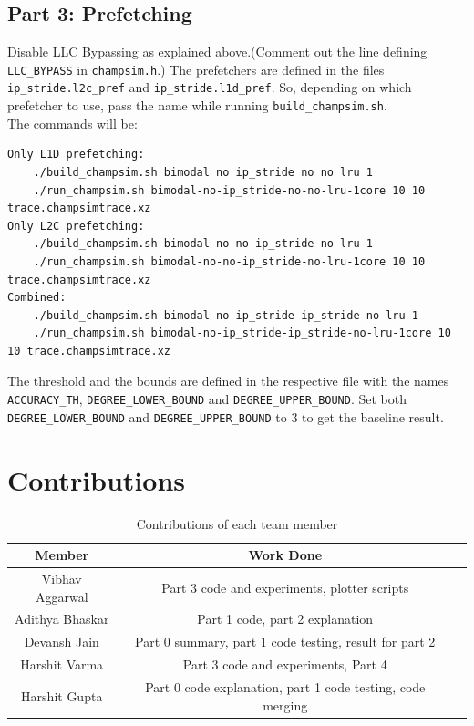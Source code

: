 \documentclass[11pt, swedish, openany]{book}
\begin{document}
\section{Part 3: Prefetching}
Disable LLC Bypassing as explained above.(Comment out the line defining \texttt{LLC\_BYPASS} in \texttt{champsim.h}.) The prefetchers are defined in the files \texttt{ip\_stride.l2c\_pref} and \texttt{ip\_stride.l1d\_pref}. So, depending on which prefetcher to use, pass the name while running \texttt{build\_champsim.sh}.\\
The commands will be:
\begin{verbatim}
Only L1D prefetching:
    ./build_champsim.sh bimodal no ip_stride no no lru 1
    ./run_champsim.sh bimodal-no-ip_stride-no-no-lru-1core 10 10 trace.champsimtrace.xz
Only L2C prefetching:
    ./build_champsim.sh bimodal no no ip_stride no lru 1
    ./run_champsim.sh bimodal-no-no-ip_stride-no-lru-1core 10 10 trace.champsimtrace.xz
Combined:
    ./build_champsim.sh bimodal no ip_stride ip_stride no lru 1
    ./run_champsim.sh bimodal-no-ip_stride-ip_stride-no-lru-1core 10 10 trace.champsimtrace.xz
\end{verbatim}
The threshold and the bounds are defined in the respective file with the names \texttt{ACCURACY\_TH}, \texttt{DEGREE\_LOWER\_BOUND} and \texttt{DEGREE\_UPPER\_BOUND}. Set both \texttt{DEGREE\_LOWER\_BOUND} and \texttt{DEGREE\_UPPER\_BOUND} to $3$ to get the baseline result.



\chapter{Contributions}
 {
  \renewcommand{\arraystretch}{1.2}  %
  \begin{table}[h]
      \centering
      \begin{tabular}{|c|c|p{6cm}|}
          \hline
          \textbf{Member} & \textbf{Work Done}                                         \\
          \hline
          \hline
          Vibhav Aggarwal & Part 3 code and experiments, plotter scripts               \\
          Adithya Bhaskar & Part 1 code, part 2 explanation                            \\
          Devansh Jain    & Part 0 summary, part 1 code testing, result for part 2     \\
          Harshit Varma   & Part 3 code and experiments, Part 4                        \\
          Harshit Gupta   & Part 0 code explanation, part 1 code testing, code merging \\
          \hline
      \end{tabular}
      \caption{Contributions of each team member}
  \end{table}
 }
\end{document}

